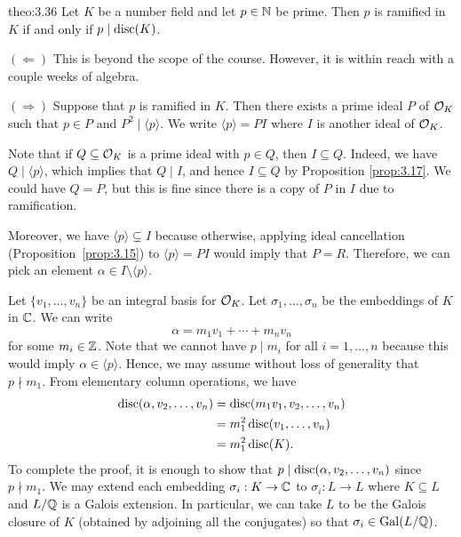 \begin{theo}{theo:3.36}
    Let $K$ be a number field and let $p \in \mathbb{N}$ be prime. Then $p$ 
    is ramified in $K$ if and only if $p \mid \operatorname{disc}(K)$. 
\end{theo}\vspace{-0.25cm}
\begin{pf}
    $(\Leftarrow)$ This is beyond the scope of the course. However, it is within 
    reach with a couple weeks of algebra.

    $(\Rightarrow)$ Suppose that $p$ is ramified in $K$. 
    Then there exists a prime ideal $P$ of ${\cal O}_K$ such that $p \in P$ 
    and $P^2 \mid \langle p \rangle$. We write $\langle p \rangle = PI$ 
    where $I$ is another ideal of ${\cal O}_K$. 

    Note that if $Q \subseteq {\cal O}_K$ is a prime ideal with $p \in Q$, 
    then $I \subseteq Q$. Indeed, we have $Q \mid \langle p \rangle$, 
    which implies that $Q \mid I$, and hence $I \subseteq Q$ by Proposition 
    \ref{prop:3.17}. We could have $Q = P$, but this is fine since 
    there is a copy of $P$ in $I$ due to ramification. 

    Moreover, we have $\langle p \rangle \subsetneq I$ because otherwise, 
    applying ideal cancellation (Proposition~\ref{prop:3.15}) to 
    $\langle p \rangle = PI$ would imply that 
    $P = R$. Therefore, we can pick an element $\alpha \in I \setminus \langle p \rangle$.
    
    Let $\{v_1, \dots, v_n\}$ be an integral basis for ${\cal O}_K$. 
    Let $\sigma_1, \dots, \sigma_n$ be the embeddings of $K$ in $\mathbb{C}$. 
    We can write 
    \[ \alpha = m_1 v_1 + \cdots + m_n v_n \] 
    for some $m_i \in \mathbb{Z}$. Note that we cannot have $p \mid m_i$ 
    for all $i = 1, \dots, n$ because this would imply $\alpha \in \langle p \rangle$. 
    Hence, we may assume without loss of generality that $p \nmid m_1$. 
    From elementary column operations, we have
    \begin{align*}
        \operatorname{disc}(\alpha, v_2, \dots, v_n) &= \operatorname{disc}(m_1v_1, v_2, \dots, v_n) \\ 
        &= m_1^2 \operatorname{disc}(v_1, \dots, v_n) \\ 
        &= m_1^2 \operatorname{disc}(K). 
    \end{align*}
    To complete the proof, it is enough to show that $p \mid 
    \operatorname{disc}(\alpha, v_2, \dots, v_n)$ since $p \nmid m_1$. We may extend 
    each embedding $\sigma_i : K \to \mathbb{C}$ to $\sigma_i : L \to L$ where $K \subseteq L$
    and $L/\mathbb{Q}$ is a Galois extension. In particular, we can take 
    $L$ to be the Galois closure of $K$ (obtained by adjoining 
    all the conjugates) so that $\sigma_i \in \operatorname{Gal}(L/\mathbb{Q})$.


\end{pf}
